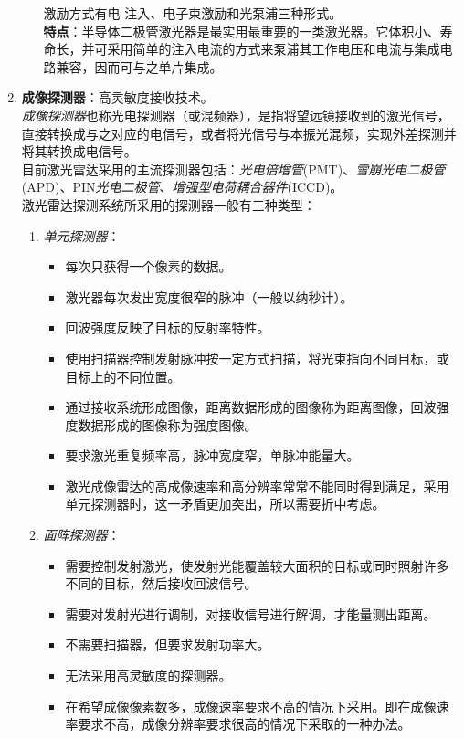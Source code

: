 \begin{enumerate}
\begin{enumerate}
		激励方式有电 注入、电子束激励和光泵浦三种形式。\\
		\textbf{特点}：半导体二极管激光器是最实用最重要的一类激光器。它体积小、寿命长，并可采用简单的注入电流的方式来泵浦其工作电压和电流与集成电路兼容，因而可与之单片集成。\\
	\end{enumerate}
	\item \textbf{成像探测器}：高灵敏度接收技术。\\ %
	\textit{成像探测器}也称光电探测器（或混频器），是指将望远镜接收到的激光信号，直接转换成与之对应的电信号，或者将光信号与本振光混频，实现外差探测并将其转换成电信号。\\
	目前激光雷达采用的主流探测器包括：\textit{光电倍增管}(PMT)、\textit{雪崩光电二极管}(APD)、PIN\textit{光电二极管}、\textit{增强型电荷耦合器件}(ICCD)。\\
	激光雷达探测系统所采用的探测器一般有三种类型：\begin{enumerate}
		\item \textit{单元探测器}：\begin{itemize}
			\item 每次只获得一个像素的数据。
			\item 激光器每次发出宽度很窄的脉冲（一般以纳秒计）。
			\item 回波强度反映了目标的反射率特性。
			\item 使用扫描器控制发射脉冲按一定方式扫描，将光束指向不同目标，或目标上的不同位置。
			\item 通过接收系统形成图像，距离数据形成的图像称为距离图像，回波强度数据形成的图像称为强度图像。
			\item 要求激光重复频率高，脉冲宽度窄，单脉冲能量大。
			\item 激光成像雷达的高成像速率和高分辨率常常不能同时得到满足，采用单元探测器时，这一矛盾更加突出，所以需要折中考虑。
		\end{itemize}
		\item \textit{面阵探测器}：\begin{itemize}
			\item 需要控制发射激光，使发射光能覆盖较大面积的目标或同时照射许多不同的目标，然后接收回波信号。
			\item 需要对发射光进行调制，对接收信号进行解调，才能量测出距离。
			\item 不需要扫描器，但要求发射功率大。
			\item 无法采用高灵敏度的探测器。
			\item 在希望成像像素数多，成像速率要求不高的情况下采用。即在成像速率要求不高，成像分辨率要求很高的情况下采取的一种办法。

\end{itemize}
\end{enumerate}
\end{enumerate}
